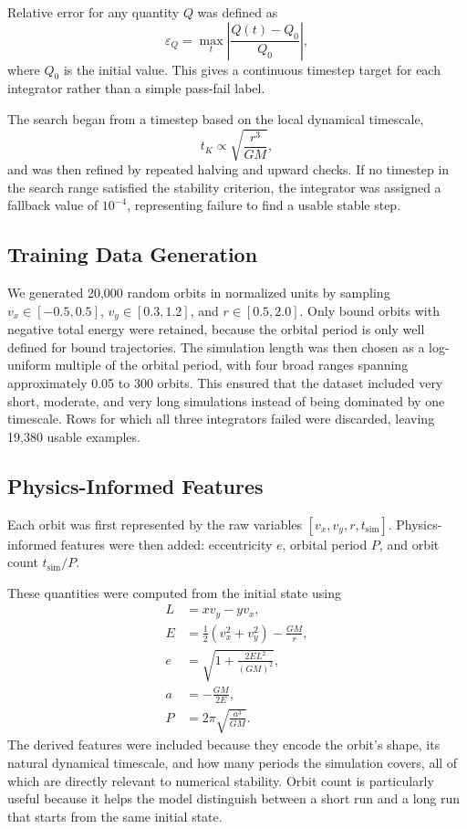 \documentclass[12pt]{article}
\begin{document}
Relative error for any quantity $Q$ was defined as
\begin{equation}
    \varepsilon_Q = \max_t \left|\frac{Q(t)-Q_0}{Q_0}\right|,
\end{equation}
where $Q_0$ is the initial value. This gives a continuous timestep target for each integrator rather than a simple pass-fail label.

The search began from a timestep based on the local dynamical timescale,
\begin{equation}
    t_K \propto \sqrt{\frac{r^3}{GM}},
\end{equation}
and was then refined by repeated halving and upward checks. If no timestep in the search range satisfied the stability criterion, the integrator was assigned a fallback value of $10^{-4}$, representing failure to find a usable stable step.

\subsection{Training Data Generation}
We generated 20,000 random orbits in normalized units by sampling $v_x \in [-0.5, 0.5]$, $v_y \in [0.3, 1.2]$, and $r \in [0.5, 2.0]$. Only bound orbits with negative total energy were retained, because the orbital period is only well defined for bound trajectories. The simulation length was then chosen as a log-uniform multiple of the orbital period, with four broad ranges spanning approximately 0.05 to 300 orbits. This ensured that the dataset included very short, moderate, and very long simulations instead of being dominated by one timescale. Rows for which all three integrators failed were discarded, leaving 19,380 usable examples.

\subsection{Physics-Informed Features}
Each orbit was first represented by the raw variables $\left[v_x, v_y, r, t_{\mathrm{sim}}\right]$. Physics-informed features were then added: eccentricity $e$, orbital period $P$, and orbit count $t_{\mathrm{sim}}/P$.

These quantities were computed from the initial state using
\begin{align}
    L &= x v_y - y v_x, \\
    E &= \frac{1}{2}\left(v_x^2+v_y^2\right) - \frac{GM}{r}, \\
    e &= \sqrt{1 + \frac{2EL^2}{(GM)^2}}, \\
    a &= -\frac{GM}{2E}, \\
    P &= 2\pi \sqrt{\frac{a^3}{GM}}.
\end{align}
The derived features were included because they encode the orbit's shape, its natural dynamical timescale, and how many periods the simulation covers, all of which are directly relevant to numerical stability. Orbit count is particularly useful because it helps the model distinguish between a short run and a long run that starts from the same initial state.
\end{document}

